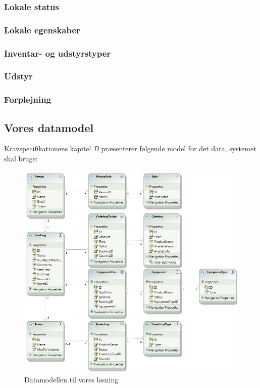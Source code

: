 \subsubsection{Lokale status}
\label{Technical_Database_ks_roomStatus}

\subsubsection{Lokale egenskaber}
\label{Technical_Database_ks_roomProperties}

\subsubsection{Inventar- og udstyrstyper}
\label{Technical_Database_ks_types}

\subsubsection{Udstyr}
\label{Technical_Database_ks_eChoice}

\subsubsection{Forplejning}
\label{Technical_Database_ks_catering}

\subsection{Vores datamodel}
\label{Technical_Database_our}

Kravspecifikationens kapitel \textit{D} \cite[s.14]{kravspec} præsenterer følgende model for det data, systemet skal bruge:
\begin{figure}[h!]
  \centering
    \includegraphics[width=\textwidth]{Chapters/Design/Technical/Images/OurDataModel}
  \caption{Datamodellen til vores løsning}
\label{Fig:Technical_Database_our_datamodel}
\end{figure}